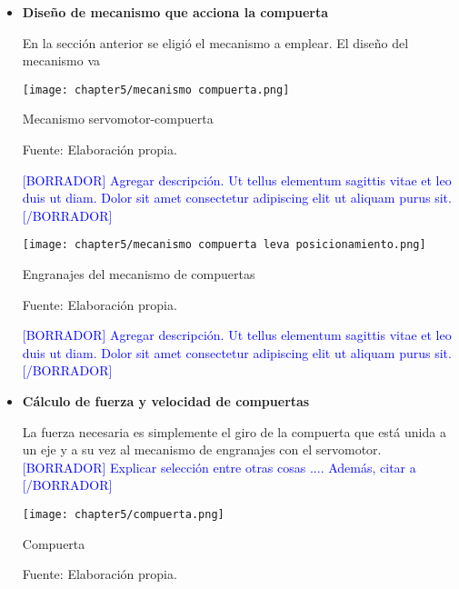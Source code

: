 \begin{itemize}
	\item \textbf{Diseño de mecanismo que acciona la compuerta}
	
	
	
	En la sección anterior se eligió el mecanismo a emplear. El diseño del mecanismo va
	
	\begin{myfigure}[H]
		\centering
		\texttt{[image: chapter5/mecanismo compuerta.png]}
		\caption{Mecanismo servomotor-compuerta}
		\begin{myflushleftportland}
			Fuente: Elaboración propia.
		\end{myflushleftportland}
		\label{fig:mecanismo servomotor-compuerta}
	\end{myfigure}
	
	\textcolor{blue}{[BORRADOR] Agregar descripción. Ut tellus elementum sagittis vitae et leo duis ut diam. Dolor sit amet consectetur adipiscing elit ut aliquam purus sit. [/BORRADOR]}	 
	
	\begin{myfigure}[H]
		\centering
		\texttt{[image: chapter5/mecanismo compuerta leva posicionamiento.png]}
		\caption{Engranajes del mecanismo de compuertas}
		\begin{myflushleftportland}
			Fuente: Elaboración propia.
		\end{myflushleftportland}
		\label{fig:mecanismo de compuertas engranajes}
	\end{myfigure}
	
	\textcolor{blue}{[BORRADOR] Agregar descripción. Ut tellus elementum sagittis vitae et leo duis ut diam. Dolor sit amet consectetur adipiscing elit ut aliquam purus sit. [/BORRADOR]}	 
	
	\item \textbf{Cálculo de fuerza y velocidad de compuertas}
	
	La fuerza necesaria es simplemente el giro de la compuerta que está unida a un eje y a su vez al mecanismo de engranajes con el servomotor.\textcolor{blue}{[BORRADOR] Explicar selección entre otras cosas .... Además, citar a \cite{ChinchayDeLaCruz2010} [/BORRADOR]}
	
	\begin{myfigure}[H]
		\centering
		\texttt{[image: chapter5/compuerta.png]}
		\caption{Compuerta}
		\begin{myflushleftportland}
			Fuente: Elaboración propia.
		\end{myflushleftportland}
		\label{fig:compuerta}
	\end{myfigure}
	

\end{itemize}
